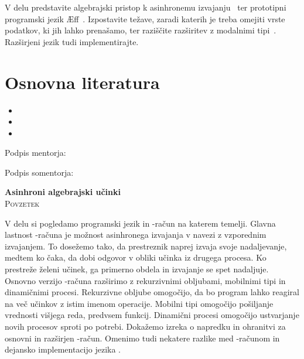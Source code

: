 \documentclass[12pt,a4paper,twoside]{article}
\newcommand{\naslovdela}{Asinhroni algebrajski učinki}
\newcommand{\plancite}[1]{\item[\cite{#1}] \bibentry{#1}} %
\theoremstyle{definition} %
\theoremstyle{plain} %
\numberwithin{equation}{section}  %
\begin{document}
V delu predstavite algebrajski pristop k asinhronemu izvajanju~\cite{aeff} ter prototipni programski jezik Æff~\cite{webaeff}.
Izpostavite težave, zaradi katerih je treba omejiti vrste podatkov, ki jih lahko prenašamo, ter raziščite razširitev z modalnimi tipi~\cite{fitch}. Razširjeni jezik tudi implementirajte.

\section*{Osnovna literatura}
\begin{itemize}
  \plancite{aeff}
  \plancite{webaeff}
  \plancite{fitch}
\end{itemize}

\vspace{2cm}
\hspace*{\fill} Podpis mentorja: \phantom{prostor za podpis}

 \vspace{2cm}
 \hspace*{\fill} Podpis somentorja: \phantom{prostor za podpis}

\cleardoublepage
{}

\begin{center}
\textbf{\naslovdela} \\[3mm]
\textsc{Povzetek} \\[2mm]
\end{center}
V delu si pogledamo programski jezik \aeff{} in \lae{}-račun na katerem temelji. Glavna lastnost \lae{}-računa je možnost asinhronega izvajanja v navezi z vzporednim izvajanjem. To dosežemo tako, da prestreznik naprej izvaja svoje nadaljevanje, medtem ko čaka, da dobi odgovor v obliki učinka iz drugega procesa. Ko prestreže želeni učinek, ga primerno obdela in izvajanje se spet nadaljuje. Osnovno verzijo \lae{}-računa razširimo z rekurzivnimi obljubami, mobilnimi tipi in dinamičnimi procesi. Rekurzivne obljube omogočijo, da bo program lahko reagiral na več učinkov z istim imenom operacije. Mobilni tipi omogočijo pošiljanje vrednosti višjega reda, predvsem funkcij. Dinamični procesi omogočijo ustvarjanje novih procesov sproti po potrebi. 
Dokažemo izreka o napredku in ohranitvi za osnovni in razširjen \lae{}-račun.
Omenimo tudi nekatere razlike med \lae{}-računom in dejansko implementacijo jezika \aeff{}.
\end{document}
